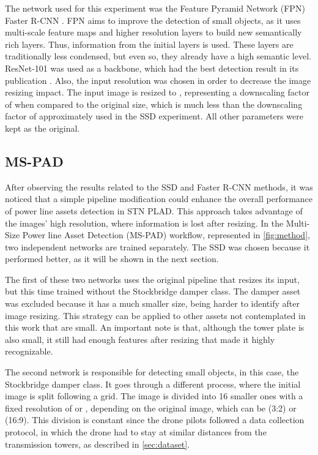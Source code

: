 \documentclass[10pt,conference]{IEEEtran}
\begin{document}
The network used for this experiment was the Feature Pyramid Network (FPN) Faster R-CNN \cite{lin2017feature}. FPN aims to improve the detection of small objects, as it uses multi-scale feature maps and higher resolution layers to build new semantically rich layers. Thus, information from the initial layers is used. These layers are traditionally less condensed, but even so, they already have a high semantic level. ResNet-101 was used as a backbone, which had the best detection result in its publication \cite{lin2017feature}. Also, the input resolution was chosen in order to decrease the image resizing impact. The input image is resized to , representing a downscaling factor of  when compared to the original size, which is much less than the downscaling factor of approximately  used in the SSD experiment. All other parameters were kept as the original. 







\subsection{MS-PAD}
\label{sec:ourmethod}

After observing the results related to the SSD and Faster R-CNN methods, it was noticed that a simple pipeline modification could enhance the overall performance of power line assets detection in STN PLAD. This approach takes advantage of the images' high resolution, where information is lost after resizing. In the Multi-Size Power line Asset Detection (MS-PAD) workflow, represented in \autoref{fig:method}, two independent networks are trained separately. The SSD was chosen because it performed better, as it will be shown in the next section.

The first of these two networks uses the original pipeline that resizes its input, but this time trained without the Stockbridge damper class. The damper asset was excluded because it has a much smaller size, being harder to identify after image resizing. This strategy can be applied to other assets not contemplated in this work that are small. An important note is that, although the tower plate is also small, it still had enough features after resizing that made it highly recognizable.

The second network is responsible for detecting small objects, in this case, the Stockbridge damper class. It goes through a different process, where the initial image is split following a grid. The image is divided into 16 smaller ones with a fixed resolution of  or , depending on the original image, which can be  (3:2) or  (16:9). This  division is constant since the drone pilots followed a data collection protocol, in which the drone had to stay at similar distances from the transmission towers, as described in \autoref{sec:dataset}. 
\end{document}
